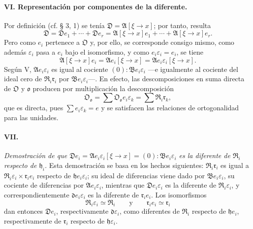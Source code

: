 \paragraph{VI. Representación por componentes de la diferente.}
Por definición (cf. § 3, 1) se tenía $\mathfrak D=\mathfrak A[\xi\to x]$; por tanto, resulta
\[
\mathfrak D=\mathfrak D e_1+\cdots+\mathfrak D e_r
=\mathfrak A[\xi\to x]e_1+\cdots+\mathfrak A[\xi\to x]e_r.
\]
Pero como $e_i$ pertenece a $\mathfrak O$ y, por ello, se corresponde consigo mismo, como además $\varepsilon_i$ pasa a $e_i$ bajo el isomorfismo, y como $e_i\varepsilon_i=e_i$, se tiene
\[
\mathfrak A[\xi\to x]e_i=\mathfrak A e_i[\xi\to x]
=\mathfrak A e_i\varepsilon_i[\xi\to x].
\]
Según V, $\mathfrak A e_i\varepsilon_i$ es igual al cociente $(0):\mathfrak B e_i\varepsilon_i$ ---e igualmente al cociente del ideal cero de $\mathfrak R_i\mathfrak r_i$ por $\mathfrak B e_i\varepsilon_i$---. En efecto, las descomposiciones en suma directa de $\mathfrak O$ y $\mathfrak o$ producen por multiplicación la descomposición
\[
\mathfrak O_{\mathfrak o}=\sum\mathfrak O_{\mathfrak o}e_i\varepsilon_k
=\sum\mathfrak R_i\mathfrak r_k,
\]
que es directa, pues $\sum e_i\varepsilon_k=e$ y se satisfacen las relaciones de ortogonalidad para las unidades.

\paragraph{VII.}
\emph{Demostración de que $\mathfrak D e_i=\mathfrak A e_i\varepsilon_i[\xi\to x]=(0):\mathfrak B e_i\varepsilon_i$ es la diferente de $\mathfrak R_i$ respecto de $\mathfrak h_i$.} Esta demostración se basa en los hechos siguientes: $\mathfrak R_i\mathfrak r_i$ es igual a $\mathfrak R_i\varepsilon_i\times\mathfrak r_i e_i$ respecto de $\mathfrak h e_i\varepsilon_i$; su ideal de diferencias viene dado por $\mathfrak B e_i\varepsilon_i$, su cociente de diferencias por $\mathfrak A e_i\varepsilon_i$, mientras que $\mathfrak D e_i\varepsilon_i$ es la diferente de $\mathfrak R_i\varepsilon_i$, y correspondientemente $\mathfrak d e_i\varepsilon_i$ es la diferente de $\mathfrak r_i e_i$. Los isomorfismos
\[
\mathfrak R_i\varepsilon_i\simeq\mathfrak R_i
\qquad\text{y}\qquad
\mathfrak r_i e_i\simeq\mathfrak r_i
\]
dan entonces $\mathfrak D e_i$, respectivamente $\mathfrak d\varepsilon_i$, como diferentes de $\mathfrak R_i$ respecto de $\mathfrak h e_i$, respectivamente de $\mathfrak r_i$ respecto de $\mathfrak h\varepsilon_i$.


